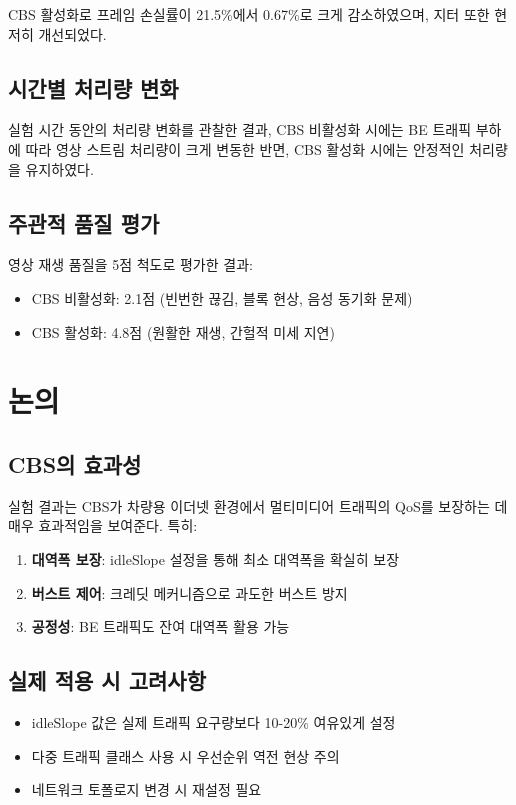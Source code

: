 \documentclass[10pt,twocolumn]{article}
\begin{document}
CBS 활성화로 프레임 손실률이 21.5\%에서 0.67\%로 크게 감소하였으며, 지터 또한 현저히 개선되었다.

\subsection{시간별 처리량 변화}
실험 시간 동안의 처리량 변화를 관찰한 결과, CBS 비활성화 시에는 BE 트래픽 부하에 따라 영상 스트림 처리량이 크게 변동한 반면, CBS 활성화 시에는 안정적인 처리량을 유지하였다.

\subsection{주관적 품질 평가}
영상 재생 품질을 5점 척도로 평가한 결과:

\begin{itemize}
\item CBS 비활성화: 2.1점 (빈번한 끊김, 블록 현상, 음성 동기화 문제)
\item CBS 활성화: 4.8점 (원활한 재생, 간헐적 미세 지연)
\end{itemize}

\section{논의}

\subsection{CBS의 효과성}
실험 결과는 CBS가 차량용 이더넷 환경에서 멀티미디어 트래픽의 QoS를 보장하는 데 매우 효과적임을 보여준다. 특히:

\begin{enumerate}
\item \textbf{대역폭 보장}: idleSlope 설정을 통해 최소 대역폭을 확실히 보장
\item \textbf{버스트 제어}: 크레딧 메커니즘으로 과도한 버스트 방지
\item \textbf{공정성}: BE 트래픽도 잔여 대역폭 활용 가능
\end{enumerate}

\subsection{실제 적용 시 고려사항}
\begin{itemize}
\item idleSlope 값은 실제 트래픽 요구량보다 10-20\% 여유있게 설정
\item 다중 트래픽 클래스 사용 시 우선순위 역전 현상 주의
\item 네트워크 토폴로지 변경 시 재설정 필요
\end{itemize}
\end{document}
